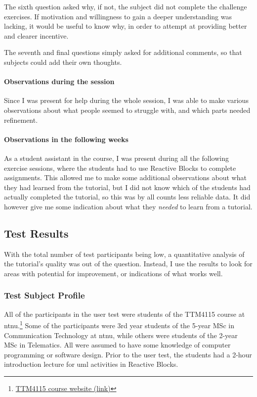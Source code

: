 \noindent
The sixth question asked why, if not, the subject did not complete the challenge exercises. If motivation and willingness to gain a deeper understanding was lacking, it would be useful to know why, in order to attempt at providing better and clearer incentive.

\noindent
The seventh and final questions simply asked for additional comments, so that subjects could add their own thoughts.

\paragraph{Observations during the session} Since I was present for help during the whole session, I was able to make various observations about what people seemed to struggle with, and which parts needed refinement.

\paragraph{Observations in the following weeks} As a student assistant in the course, I was present during all the following exercise sessions, where the students had to use Reactive Blocks to complete assignments. This allowed me to make some additional observations about what they had learned from the tutorial, but I did not know which of the students had actually completed the tutorial, so this was by all counts less reliable data. It did however give me some indication about what they \emph{needed} to learn from a tutorial.

\subsection{Test Results}
\label{sec:tutorial_test_results}
With the total number of test participants being low, a quantitative analysis of the tutorial's quality was out of the question. Instead, I use the results to look for areas with potential for improvement, or indications of what works well.

\subsubsection{Test Subject Profile}
All of the participants in the user test were students of the TTM4115 course at \gls{ntnu}.\footnote{\href{http://www.item.ntnu.no/academics/courses/ttm4115/start}{TTM4115 course website (link)}} Some of the participants were 3rd year students of the 5-year MSc in Communication Technology at \gls{ntnu}, while others were students of the 2-year MSc in Telematics. All were assumed to have some knowledge of computer programming or software design. Prior to the user test, the students had a 2-hour introduction lecture for \gls{uml} activities in Reactive Blocks.

